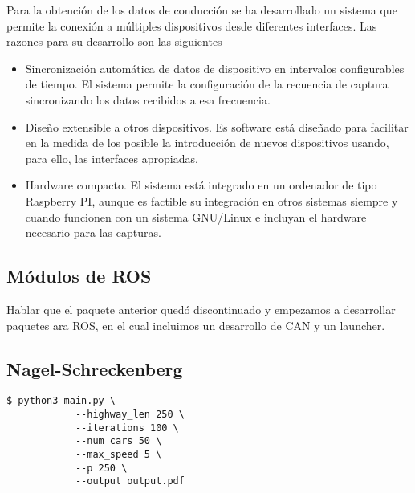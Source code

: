 Para la obtención de los datos de conducción se ha desarrollado un sistema que permite la conexión a múltiples dispositivos desde diferentes interfaces. Las razones para su desarrollo son las siguientes

\begin{itemize}
	\item Sincronización automática de datos de dispositivo en intervalos configurables de tiempo. El sistema permite la configuración de la recuencia de captura sincronizando los datos recibidos a esa frecuencia.
	\item Diseño extensible a otros dispositivos. Es software está diseñado para facilitar en la medida de los posible la introducción de nuevos dispositivos usando, para ello, las interfaces apropiadas.
	\item Hardware compacto. El sistema está integrado en un ordenador de tipo Raspberry PI, aunque es factible su integración en otros sistemas siempre y cuando funcionen con un sistema GNU/Linux e incluyan el hardware necesario para las capturas.
\end{itemize}

\subsection{Módulos de ROS}

Hablar que el paquete anterior quedó discontinuado y empezamos a desarrollar paquetes ara ROS, en el cual incluimos un desarrollo de CAN y un launcher.

\subsection{Nagel-Schreckenberg}

\begin{lstlisting}[style=bash]
$ python3 main.py \
            --highway_len 250 \
            --iterations 100 \
            --num_cars 50 \
            --max_speed 5 \
            --p 250 \
            --output output.pdf
\end{lstlisting}